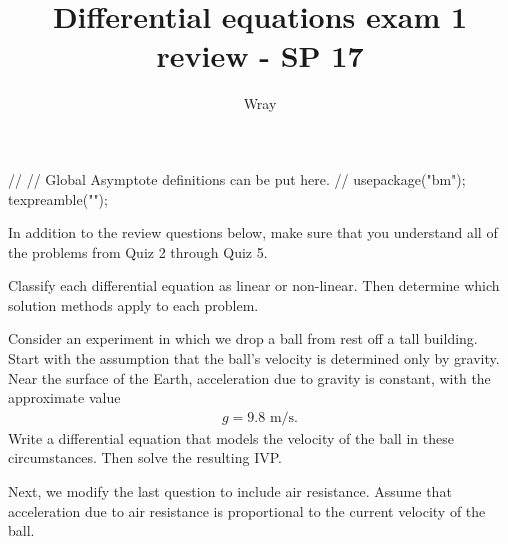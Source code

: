 \documentclass[12pt]{exam}
\title{Differential equations exam 1 review - SP 17}
\author{Wray}
\begin{document}
\begin{asydef}
//
// Global Asymptote definitions can be put here.
//
usepackage("bm");
texpreamble("\def\V#1{\bm{#1}}");
\end{asydef}

\bigskip
\bigskip

In addition to the review questions below, make sure that you understand all of the problems from Quiz 2 through Quiz 5.

\begin{questions}

\question
Classify each differential equation as linear or non-linear.  Then determine which solution methods apply to each problem.
\begin{multicols}{2}
\end{multicols}

\question
Consider an experiment in which we drop a ball from rest off a tall building.  Start with the assumption that the ball's velocity is determined only by gravity.  Near the surface of the Earth, acceleration due to gravity is constant, with the approximate value
\begin{align*}
g = 9.8 \mbox{ m/s.}
\end{align*}
Write a differential equation that models the velocity of the ball in these circumstances.  Then solve the resulting IVP.

\question
Next, we modify the last question to include air resistance.  Assume that acceleration due to air resistance is proportional to the current velocity of the ball.  
\begin{parts}

\end{parts}
\end{questions}
\end{document}
